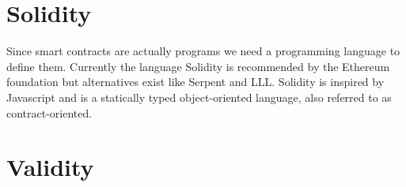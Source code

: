 \section{Solidity}

Since smart contracts are actually programs we need a programming language to
define them.
Currently the language Solidity is recommended by the Ethereum foundation but
alternatives exist like Serpent and LLL.
Solidity is inspired by Javascript and is a statically typed object-oriented
language, also referred to as contract-oriented.


\section{Validity}
